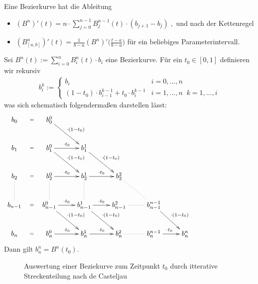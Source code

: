 \begin{Satz}
Eine Bezierkurve hat die Ableitung
\begin{itemize}
\item $(B^n)'(t) = n \cdot \sum_{j = 0}^{n-1} B_{j}^{n-1}(t) \cdot (b_{j+1} - b_j) \; ,$ und nach der Kettenregel
\item $(B^n_{[a,b]})'(t) = \frac{1}{b-a} (B^n)' \bigl(\frac{t -a}{b-a} \bigr)$  für ein beliebiges Parameterintervall.
\end{itemize}
\end{Satz}

\begin{Satz}
Sei $B^n(t) := \sum_{i = 0}^{n} B_i^n(t) \cdot  b_i$ eine Bezierkurve. Für ein 
$t_0 \in [0,1]$ definieren wir rekursiv  
\begin{align*}
b_i^k := \begin{cases}
b_i   & i= 0, \hdots,  n \\
(1-t_0) \cdot b_{i-1}^{k-1} + t_0 \cdot b_{i}^{k-1} &  i = 1, \hdots , n \; \;   k = 1, \hdots , i 
\end{cases} 
\end{align*}
was sich schematisch folgendermaßen darstellen lässt: 
\begin{align*}
\xymatrix{
b_0   \ar@{}[r]|-{=}  &  b_0^0 \ar[dr]^{\cdot(1-t_0)}  &  & & & & & &  \\
b_1   \ar@{}[r]|-{=}  &  b_1^0  \ar[r]^{\cdot t_0} \ar[dr]^{\cdot(1-t_0)} &   b_1^1  \ar[dr]^{\cdot(1-t_0)} & & & & & & \\
b_2   \ar@{}[r]|-{=}  \ar@{..}[d] &  b_2^0  \ar[r]^{\cdot t_0}  \ar@{..}[d] &   b_2^1 \ar[r]^{\cdot t_0}  \ar@{..}[d] &  b_2^2   \ar@{..}[dr]& & & & & \\
b_{n-1}   \ar@{}[r]|-{=}  &  b_{n-1}^0   \ar[r]^{\cdot t_0}  \ar[dr]^{\cdot(1-t_0)} &    b_{n-1}^1   \ar[r]^{\cdot t_0}  \ar[dr]^{\cdot(1-t_0)} &  b_{n-1}^2  \ar@{..}[r] &  
b_{n-1}^{n-1}  \ar[dr]^{\cdot(1-t_0)} & & & & \\
b_{n}   \ar@{}[r]|-{=}  &  b_{n}^0  \ar[r]^{\cdot t_0}  &    b_{n}^1   \ar[r]^{\cdot t_0}  &  b_{n}^2  \ar@{..}[r] & b_{n}^{n-1}   \ar[r]^{\cdot t_0}& b_{n}^{n}& & & 
}
\end{align*}
Dann gilt $b_n^n = B^n(t_0)$.
\end{Satz}

\begin{figure}[H]
    \centering
    
    \caption{Auswertung einer Beziekurve  zum Zeitpunkt $t_0$ durch itterative Streckenteilung nach de Casteljau} %
    \label{fig:deCastel}
\end{figure}



